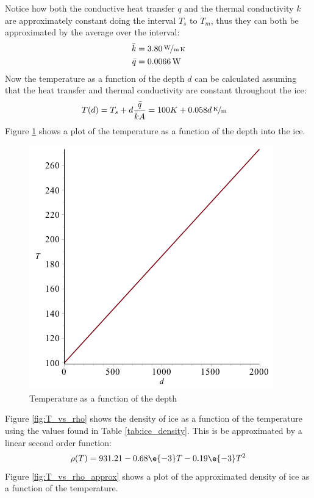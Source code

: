 Notice how both the conductive heat transfer $q$ and the thermal conductivity $k$ are approximately constant doing the interval $T_s$ to $T_m$, thus they can both be approximated by the average over the interval:
\begin{align}
	\bar{k} &= \unitfrac[3.80]{W}{m \, K} \\
	\bar{q} &= \unit[0.0066]{W}
\end{align}
Now the temperature as a function of the depth $d$ can be calculated assuming that the heat transfer and thermal conductivity are constant throughout the ice:
\begin{align}\label{eq:T_d}
	T(d) &= T_s + d \frac{\bar{q}}{\bar{k} A} = 100 K + \unitfrac[0.058 d]{K}{m}
\end{align}
Figure \ref{fig:d_vs_T} shows a plot of the temperature as a function of the depth into the ice.
\begin{figure}[htb]
	\centering
	\includegraphics[width=.48\textwidth]{figures/temperature/d_vs_T}
	\caption{Temperature as a function of the depth}
	\label{fig:d_vs_T}
\end{figure}
Figure \ref{fig:T_vs_rho} shows the density of ice as a function of the temperature using the values found in Table \ref{tab:ice_density}. This is be approximated by a linear second order function:
\begin{equation}\label{eq:rho_approx}
	\rho(T) = 931.21 - 0.68 \e{-3} T - 0.19 \e{-3} T^2
\end{equation}
Figure \ref{fig:T_vs_rho_approx} shows a plot of the approximated density of ice as a function of the temperature.
